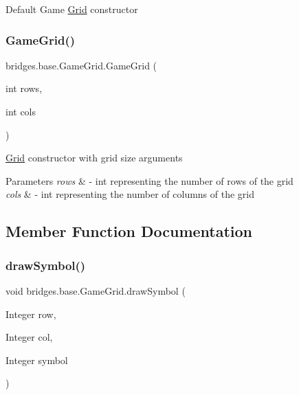 Default Game \hyperlink{classbridges_1_1base_1_1_grid}{Grid} constructor \mbox{\label{classbridges_1_1base_1_1_game_grid_acfe6d52979dae94b1d883fed4965feb3}} 
\subsubsection{\texorpdfstring{Game\+Grid()}{GameGrid()}\hspace{0.1cm}{\footnotesize\ttfamily [2/2]}}
{\footnotesize\ttfamily bridges.\+base.\+Game\+Grid.\+Game\+Grid (\begin{DoxyParamCaption}\item[{int}]{rows,  }\item[{int}]{cols }\end{DoxyParamCaption})}

\hyperlink{classbridges_1_1base_1_1_grid}{Grid} constructor with grid size arguments


\begin{DoxyParams}{Parameters}
{\em rows} & -\/ int representing the number of rows of the grid \\
\hline
{\em cols} & -\/ int representing the number of columns of the grid \\
\hline
\end{DoxyParams}


\subsection{Member Function Documentation}
\mbox{\label{classbridges_1_1base_1_1_game_grid_a8eee4918e2cbfc956a92a39252590114}} 
\subsubsection{\texorpdfstring{draw\+Symbol()}{drawSymbol()}\hspace{0.1cm}{\footnotesize\ttfamily [1/6]}}
{\footnotesize\ttfamily void bridges.\+base.\+Game\+Grid.\+draw\+Symbol (\begin{DoxyParamCaption}\item[{Integer}]{row,  }\item[{Integer}]{col,  }\item[{Integer}]{symbol }\end{DoxyParamCaption})}

